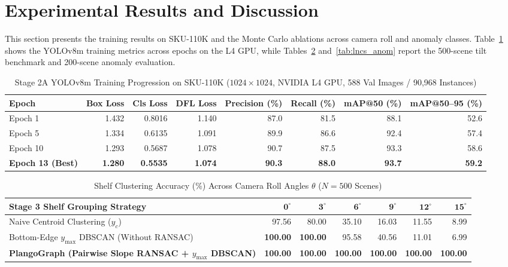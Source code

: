\documentclass[10pt,a4paper]{article}
\begin{document}
\section{Experimental Results and Discussion}
This section presents the training results on SKU-110K and the Monte Carlo ablations across camera roll and anomaly classes. Table~\ref{tab:lncs_yolo} shows the YOLOv8m training metrics across epochs on the L4 GPU, while Tables~\ref{tab:lncs_tilt} and~\ref{tab:lncs_anom} report the 500-scene tilt benchmark and 200-scene anomaly evaluation.

\begin{table}[h]
\centering
\caption{Stage 2A YOLOv8m Training Progression on SKU-110K ($1024\times 1024$, NVIDIA L4 GPU, 588 Val Images / 90,968 Instances)}
\label{tab:lncs_yolo}
\footnotesize
\begin{tabularx}{\textwidth}{X r r r r r r r}
\toprule
\textbf{Epoch} & \textbf{Box Loss} & \textbf{Cls Loss} & \textbf{DFL Loss} & \textbf{Precision (\%)} & \textbf{Recall (\%)} & \textbf{mAP@50 (\%)} & \textbf{mAP@50--95 (\%)} \\
\midrule
Epoch 1 & 1.432 & 0.8016 & 1.140 & 87.0 & 81.5 & 88.1 & 52.6 \\
Epoch 5 & 1.334 & 0.6135 & 1.091 & 89.9 & 86.6 & 92.4 & 57.4 \\
Epoch 10 & 1.293 & 0.5687 & 1.078 & 90.7 & 87.5 & 93.3 & 58.6 \\
\textbf{Epoch 13 (Best)} & \textbf{1.280} & \textbf{0.5535} & \textbf{1.074} & \textbf{90.3} & \textbf{88.0} & \textbf{93.7} & \textbf{59.2} \\
\bottomrule
\end{tabularx}
\end{table}

\begin{table}[h]
\centering
\caption{Shelf Clustering Accuracy (\%) Across Camera Roll Angles $\theta$ ($N=500$ Scenes)}
\label{tab:lncs_tilt}
\footnotesize
\begin{tabularx}{\textwidth}{X r r r r r r}
\toprule
\textbf{Stage 3 Shelf Grouping Strategy} & $\mathbf{0^\circ}$ & $\mathbf{3^\circ}$ & $\mathbf{6^\circ}$ & $\mathbf{9^\circ}$ & $\mathbf{12^\circ}$ & $\mathbf{15^\circ}$ \\
\midrule
Naive Centroid Clustering ($y_c$) & 97.56 & 80.00 & 35.10 & 16.03 & 11.55 & 8.99 \\
Bottom-Edge $y_{\max}$ DBSCAN (Without RANSAC) & \textbf{100.00} & \textbf{100.00} & 95.58 & 40.56 & 11.01 & 6.99 \\
\textbf{PlangoGraph (Pairwise Slope RANSAC + $y_{\max}$ DBSCAN)} & \textbf{100.00} & \textbf{100.00} & \textbf{100.00} & \textbf{100.00} & \textbf{100.00} & \textbf{100.00} \\
\bottomrule
\end{tabularx}
\end{table}
\end{document}
